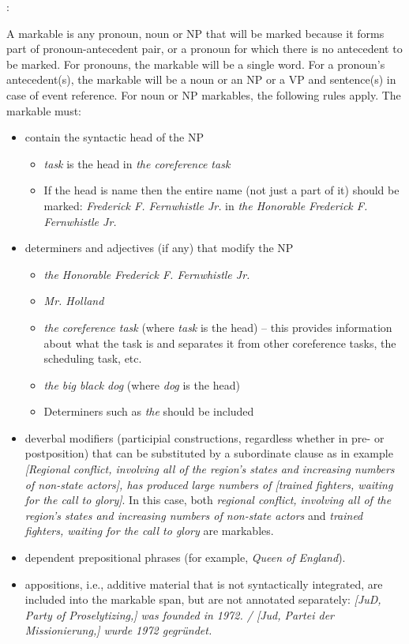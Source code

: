 \documentclass[a4paper]{article}
\begin{document}
\cite{GrishinaStedeGuide,GuillouEtAlGuide}:

A markable is any pronoun, noun or NP that will be marked because it forms part of pronoun-antecedent pair, or a pronoun for which there is no antecedent to be marked. For pronouns, the markable will be a single word. For a pronoun's antecedent(s), the markable will be a noun or an NP or a VP and sentence(s) in case of event reference. For noun or NP markables, the following rules apply. The markable must:

\begin{itemize}
\item contain the syntactic head of the NP
\begin{itemize}
\item {\sl task} is the head in {\sl the coreference task}
\item If the head is name then the entire name (not just a part of it) should be marked: {\sl Frederick F. Fernwhistle Jr.} in {\sl the Honorable Frederick F. Fernwhistle Jr.}
\end{itemize}

\item  determiners and adjectives (if any) that modify the NP
\begin{itemize}
\item {\sl the Honorable Frederick F. Fernwhistle Jr.}
\item {\sl Mr. Holland}
\item {\sl the coreference task} (where {\sl task} is the head) -- this provides information about what the task is and separates it from other coreference tasks, the scheduling task, etc.
\item {\sl the big black dog} (where {\sl dog} is the head)
\item Determiners such as {\sl the} should be included
\end{itemize}

\item deverbal modifiers (participial constructions, regardless whether in pre- or postposition) that
can be substituted by a subordinate clause as in example  {\sl [Regional conflict, involving all of the region's states and increasing numbers of non-state actors], has produced large numbers of [trained fighters, waiting for the call to glory]}. 
In this case, both {\sl regional conflict, involving all of the region’s states and increasing numbers of non-state actors} and {\sl trained fighters, waiting for the call to glory} are markables.
\item dependent prepositional phrases (for example, {\sl Queen of England}).
\item  appositions, i.e., additive material that is not syntactically integrated, are included into the markable span, but are not annotated separately: {\sl [JuD, Party of Proselytizing,] was founded in 1972. / [Jud, Partei der Missionierung,] wurde 1972 gegründet.}
\end{itemize}
\end{document}

